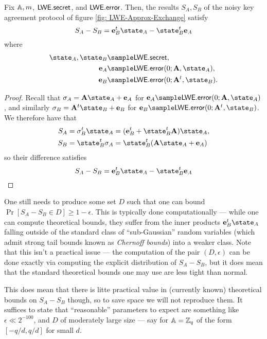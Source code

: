 \begin{lemma}\label{lem: nka}
	Fix $\mathbb{A}, m$, $\mathsf{LWE}.\mathsf{secret}$, and $\mathsf{LWE}.\mathsf{error}$.
	Then, the results $S_A, S_B$ of the noisy key agreement protocol of figure \ref{fig: LWE-Approx-Exchange} satisfy
	\begin{equation*}
	S_A - S_B = \vfont{e}_B^t \state_A - \state_B^t\vfont{e}_A
	\end{equation*}
	where
	\begin{align*}
	\state_A, \state_B&\sample \LWE.\secret,\\
	\vfont{e}_A &\sample \LWE.\error(0; \mfont{A}, \state_A),\\
	\vfont{e}_B &\sample \LWE.\error(0;\mfont{A}^t, \state_B).
	\end{align*}
\end{lemma}
\begin{proof}
	Recall that $\sigma_A = \mfont{A}\state_A + \vfont{e}_A$ for $\vfont{e}_A \sample \LWE.\error(0; \mfont{A}, \state_A)$, and similarly $\sigma_B = \mfont{A}^t \state_B+ \vfont{e}_B$ for $\vfont{e}_B\sample \LWE.\error(0; \mfont{A}^t, \state_B)$.
	We therefore have that
	\begin{align*}
	S_A &= \sigma_B^t \state_A = (\vfont{e}_B^t + \state_B^t \mfont{A})\state_A,\\
	S_B &= \state_B^t\sigma_A = \state_B^t(\mfont{A}\state_A + \vfont{e}_A)
	\end{align*}
	so their difference satisfies
	\begin{equation*}
	S_A - S_B = \vfont{e}_B^t\state_A- \state_B^t\vfont{e}_A
	\end{equation*}
\end{proof}

One still needs to produce some set $D$ such that one can bound $\Pr[S_A - S_B\in D]\geq 1 - \epsilon$.
This is typically done computationally --- while one can compute theoretical bounds, they suffer from the inner products $\vfont{e}_B^t\state_A$ falling outside of the standard class of ``sub-Gaussian'' random variables (which admit strong tail bounds known as \emph{Chernoff bounds}) into a weaker class.
Note that this isn't a practical issue --- the computation of the pair $(D, \epsilon)$ can be done exactly via computing the explicit distribution of $S_A - S_B$, but it does mean that the standard theoretical bounds one may use are less tight than normal.

This does mean that there is litte practical value in (currently known) theoretical bounds on $S_A - S_B$ though, so to save space we will not reproduce them.
It suffices to state that ``reasonable'' parameters to expect are something like $\epsilon \ll 2^{-100}$, and $D$ of moderately large size --- say for $\mathbb{A} = \mathbb{Z}_q$ of the form $[-q/d, q/d]$ for small $d$.

